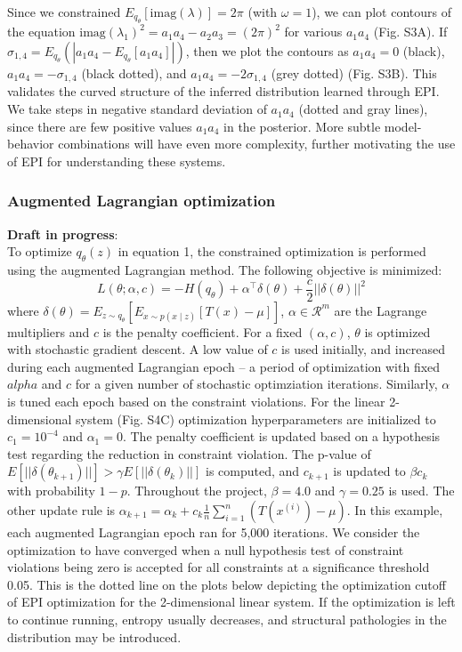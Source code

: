 \documentclass[11pt]{article}
\begin{document}
Since we constrained $E_{q_\theta}\left[\text{imag}(\lambda)\right] = 2 \pi$ (with $\omega=1$), we can plot contours of the equation $\text{imag}(\lambda_1)^2 = a_1 a_4 - a_2 a_3 = (2 \pi)^2$ for various $a_1 a_4$ (Fig. S3A). If $\sigma_{1,4} = E_{q_\theta}(|a_1 a_4 - E_{q_\theta}[a_1 a_4]|)$, then we plot the contours as $a_1 a_4 = 0$ (black), $a_1 a_4 = -\sigma_{1,4}$ (black dotted), and $a_1 a_4 = -2\sigma_{1,4}$ (grey dotted) (Fig. S3B). This validates the curved structure of the inferred distribution learned through EPI.  We take steps in negative standard deviation of $a_1 a_4$ (dotted and gray lines), since there are few positive values $a_1 a_4$ in the posterior.  More subtle model-behavior combinations will have even more complexity, further motivating the use of EPI for understanding these systems.

\subsubsection{Augmented Lagrangian optimization}\label{methods_AL_opt}
\textbf{Draft in progress}: \\
To optimize $q_\theta(z)$ in equation 1, the constrained optimization is performed using the augmented Lagrangian method.  The following objective is minimized:
\begin{equation}
L(\theta; \alpha, c) = -H(q_\theta) + \alpha^\top \delta(\theta) + \frac{c}{2}||\delta(\theta)||^2
\end{equation}
where $\delta(\theta) = E_{z \sim q_\theta}\left[ E_{x\sim p(x \mid z)}\left[T(x) - \mu \right] \right]$, $\alpha \in \mathcal{R}^m$ are the Lagrange multipliers and $c$ is the penalty coefficient.  For a fixed $(\alpha, c)$, $\theta$ is optimized with stochastic gradient descent.  A low value of $c$ is used initially, and increased during each augmented Lagrangian epoch -- a period of optimization with fixed $alpha$ and $c$ for a given number of stochastic optimziation iterations. Similarly, $\alpha$ is tuned each epoch based on the constraint violations.  For the linear 2-dimensional system (Fig. S4C) optimization hyperparameters are initialized to $c_1 = 10^{-4}$ and $\alpha_1 = 0$.  The penalty coefficient is updated based on a hypothesis test regarding the reduction in constraint violation.  The p-value of $E[||\delta(\theta_{k+1})||] > \gamma E[||\delta(\theta_{k})||]$ is computed, and $c_{k+1}$ is updated  to $\beta c_k$ with probability $1-p$.  Throughout the project, $\beta = 4.0$ and $\gamma = 0.25$ is used.  The other update rule is $\alpha_{k+1} = \alpha_k + c_k \frac{1}{n} \sum_{i=1}^n (T(x^{(i)}) - \mu)$.  In this example, each augmented Lagrangian epoch ran for 5,000 iterations.  We consider the optimization to have converged when a null hypothesis test of constraint violations being zero is accepted for all constraints at a significance threshold 0.05.  This is the dotted line on the plots below depicting the optimization cutoff of EPI optimization for the 2-dimensional linear system.  If the optimization is left to continue running, entropy usually decreases, and structural pathologies in the distribution may be introduced.
\end{document}
